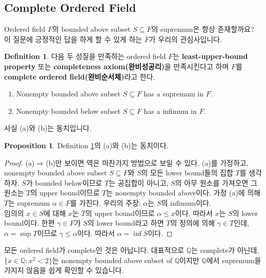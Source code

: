\documentclass[12pt]{article}
\theoremstyle{definition}
\newtheorem{prop}[thm]{Proposition}
\newtheorem{defn}[thm]{Definition}
\def\QQ{\mathbb{Q}}
\begin{document}
\subsection{Complete Ordered Field}

Ordered field \(F\)의 bounded above subset \(S \subseteq F\)의 supremum은 항상 존재할까요? 이 질문에 긍정적인 답을 하게 할 수 있게 하는 \(F\)가 우리의 관심사입니다.

	\begin{defn} \label{comp axiom}
		다음 두 성질을 만족하는 ordered field \(F\)는 \textbf{least-upper-bound property} 또는 \textbf{completeness axiom(완비성공리)}을 만족시킨다고 하며 \(F\)를 \textbf{complete ordered field(완비순서체)}라고 한다.
		\begin{enumerate} [label=(\alph*), leftmargin=2\parindent]
			\item
			Nonempty bounded above subset \(S \subseteq F\) has a supremum in \(F\).
			\item
			Nonempty bounded below subset \(S \subseteq F\) has a infimum in \(F\).
		\end{enumerate}
	\end{defn}

사실 (a)와 (b)는 동치입니다.

	\begin{prop}
		Definition \ref{comp axiom}의 (a)와 (b)는 동치이다.
	\end{prop}
	\begin{proof}
		(a)$\Rightarrow$(b)만 보이면 역은 마찬가지 방법으로 보일 수 있다. (a)를 가정하고, nonempty bounded above subset \(S \subseteq F\)와 \(S\)의 모든 lower bound들의 집합 \(T\)를 생각하자. \(S\)가 bounded below이므로 \(T\)는 공집합이 아니고, \(S\)의 아무 원소를 가져오면 그 원소는 \(T\)의 upper bound이므로 \(T\)는 nonempty bounded above이다. 가정 (a)에 의해 \(T\)는 supremum \(\alpha \in F\)를 가진다. 우리의 주장: \(\alpha\)는 \(S\)의 infimum이다.\\
		임의의 \(x \in S\)에 대해 \(x\)는 \(T\)의 upper bound이므로 \(\alpha \le x\)이다. 따라서 \(x\)는 \(S\)의 lower bound이다. 한편 \(\gamma \in F\)가 \(S\)의 lower bound라고 하면 \(T\)의 정의에 의해 \(\gamma \in T\)인데, \(\alpha = \sup T\)이므로 \(\gamma \le \alpha\)이다. 따라서 \(\alpha = \inf S\)이다.
	\end{proof}

모든 ordered field가 complete인 것은 아닙니다. 대표적으로 \(\QQ\)는 complete가 아닌데, \(\{x \in \QQ: x^2 < 2\}\)는 nonempty bounded above subset of \(\QQ\)이지만 \(\QQ\)에서 supremum을 가지지 않음을 쉽게 확인할 수 있습니다.
\end{document}

